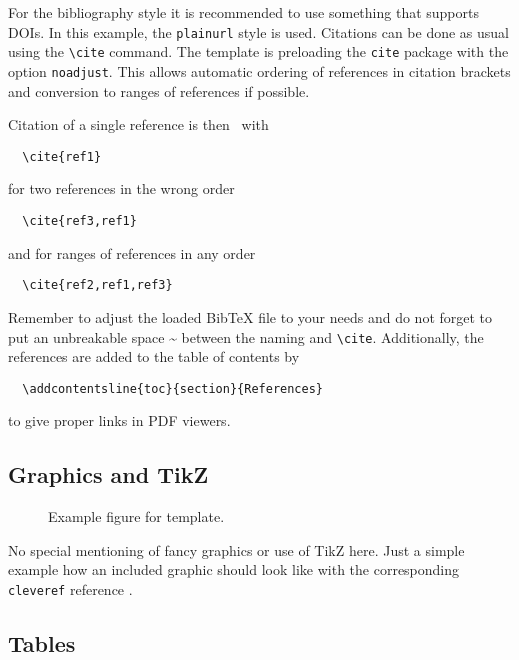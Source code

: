\documentclass[%
  a4paper,
  twocolumn,
  colorlinks,
]{preprint}
\begin{document}
For the bibliography style it is recommended to use something that supports
DOIs.
In this example, the \verb|plainurl| style is used.
Citations can be done as usual using the \verb|\cite| command.
The template is preloading the \verb|cite| package with the option
\verb|noadjust|.
This allows automatic ordering of references in citation brackets and conversion
to ranges of references if possible.

Citation of a single reference is then~\cite{ref1} with
\begin{verbatim}
  \cite{ref1}
\end{verbatim}
for two references in the wrong order~\cite{ref3, ref1}
\begin{verbatim}
  \cite{ref3,ref1}
\end{verbatim}
and for ranges of references in any order~\cite{ref2, ref1, ref3}
\begin{verbatim}
  \cite{ref2,ref1,ref3}
\end{verbatim}

Remember to adjust the loaded BibTeX file to your needs and do not forget to
put an unbreakable space \~{} between the naming and \verb|\cite|.
Additionally, the references are added to the table of contents by
\begin{verbatim}
  \addcontentsline{toc}{section}{References}
\end{verbatim}
to give proper links in PDF viewers.


\subsection{Graphics and TikZ}%
\label{subsec:graphics}

\begin{figure}[t]
  \centering

  \caption{Example figure for template.}
  \label{fig:example}
\end{figure}

No special mentioning of fancy graphics or use of TikZ here.
Just a simple example how an included graphic should look like with the
corresponding \verb|cleveref| reference .



\subsection{Tables}%
\label{subsec:tables}
\end{document}
